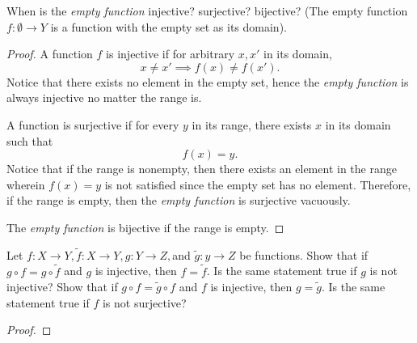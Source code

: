 \begin{exercise}[3.3.3] When is the \emph{empty function} injective? surjective?
    bijective? (The empty function $f:\emptyset \to Y$ is a function with the
    empty set as its domain).
     \begin{proof} A function $f$ is injective if for arbitrary $x,x'$ in its
     domain,
     \begin{equation*}
         x\neq x' \implies f(x)\neq f(x').
     \end{equation*}
     Notice that there exists no element in the empty set, hence the
     \emph{empty function} is always injective no matter the range is.

     A function is surjective if for every $y$ in its range, there exists $x$
     in its domain such that
     \begin{equation*}
         f(x)=y.
     \end{equation*}
     Notice that if the range is nonempty, then there exists an element in the
     range wherein $f(x)=y$ is not satisfied since the empty set has no
     element. Therefore, if the range is empty, then the \emph{empty function}
     is surjective vacuously.

     The \emph{empty function} is bijective if the range is empty.
    \end{proof}
\end{exercise}
\begin{exercise}[3.3.4] Let $f:X\to Y, \tilde{f}:X\to Y, g:Y\to Z, $and
$\tilde{g}:y\to Z$ be functions. Show that if $g\circ f = g\circ \tilde{f}$ and
$g$ is injective, then $f=\tilde{f}$. Is the same statement true if $g$ is not
injective? Show that if $g\circ f=\tilde{g}\circ f$ and $f$ is injective, then
$g=\tilde{g}$. Is the same statement true if $f$ is not surjective?
     \begin{proof}
          
     \end{proof}
\end{exercise}  